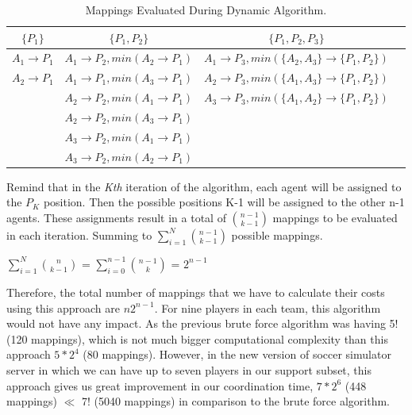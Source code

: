 \begin{table}[t!]
\label{tab:DynamicTable}
\centering
    \begin{tabular}{ | c | c | c | p{5cm} |}
    \hline
    $\lbrace P_{1} \rbrace$   & $\lbrace P_{1},P_{2} \rbrace$ 	& $\lbrace P_{1},P_{2},P_{3} \rbrace$\\ \hline
    $A_{1} \rightarrow P_{1}$ & $A_{1} \rightarrow P_{2},min(A_{2} \rightarrow P_{1})$	 	& $A_{1} \rightarrow P_{3},min(\lbrace A_{2},A_{3} \rbrace \rightarrow \lbrace P_{1},P_{2} \rbrace)$  \\ \hline
    $A_{2} \rightarrow P_{1}$ & $A_{1} \rightarrow P_{1},min(A_{3} \rightarrow P_{1})$	 	& $A_{2} \rightarrow P_{3},min(\lbrace A_{1},A_{3} \rbrace \rightarrow \lbrace P_{1},P_{2} \rbrace)$  \\ \hline
     						  & $A_{2} \rightarrow P_{2},min(A_{1} \rightarrow P_{1})$ 		& $A_{3} \rightarrow P_{3},min(\lbrace A_{1},A_{2} \rbrace \rightarrow \lbrace P_{1},P_{2} \rbrace)$  \\ \hline
       						  & $A_{2} \rightarrow P_{2},min(A_{3} \rightarrow P_{1})$ 		&   \\ \hline
       						  & $A_{3} \rightarrow P_{2},min(A_{1} \rightarrow P_{1})$ 		&   \\ \hline
    						  & $A_{3} \rightarrow P_{2},min(A_{2} \rightarrow P_{1})$		&   \\
    \hline

    \end{tabular}
    
    \caption{Mappings Evaluated During Dynamic Algorithm.}    
\end{table}
Remind that in the \textit{Kth} iteration of the algorithm, each agent will be assigned to the $P_{K}$ position. Then the possible positions K-1 will be assigned to the other n-1 agents. These assignments result in a total of $ {{n-1}\choose{k-1}} $ mappings to be evaluated in each iteration. Summing to $\sum\limits_{i=1}^N{{n-1}\choose{k-1}}$ possible mappings.\\
\begin{center}
$\sum\limits_{i=1}^N{{n}\choose{k-1}}$ = $\sum\limits_{i=0}^{n-1}{{n-1}\choose{k}}$ = $2^{n-1}$
\end{center}
Therefore, the total number of mappings that we have to calculate their costs using this approach are $n2^{n-1}$. For nine players in each team, this algorithm would not have any impact. As the previous brute force algorithm was having 5! (120 mappings), which is not much bigger computational complexity than this approach $5 \ast 2^{4}$ (80 mappings). However, in the new version of soccer simulator server in which we can have up to seven players in our support subset, this approach gives us great improvement in our coordination time, $7 \ast 2^{6}$ (448 mappings) $\ll$ 7! (5040 mappings) in comparison to the brute force algorithm.

